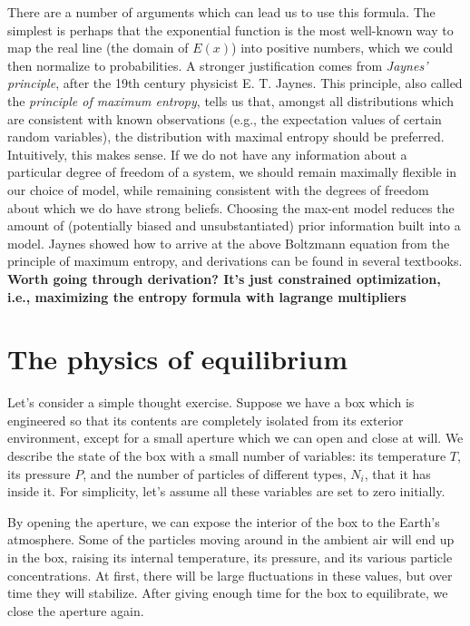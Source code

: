 \documentclass[a4paper]{article}
\begin{document}
There are a number of arguments which can lead us to use this formula. The simplest is perhaps that the exponential function is the most well-known way to map the real line (the domain of $E(x)$) into positive numbers, which we could then normalize to probabilities. A stronger justification comes from \emph{Jaynes' principle}, after the 19th century physicist E. T. Jaynes. This principle, also called the \emph{principle of maximum entropy}, tells us that, amongst all distributions which are consistent with known observations (e.g., the expectation values of certain random variables), the distribution with maximal entropy should be preferred. Intuitively, this makes sense. If we do not have any information about a particular degree of freedom of a system, we should remain maximally flexible in our choice of model, while remaining consistent with the degrees of freedom about which we do have strong beliefs. Choosing the max-ent model reduces the amount of (potentially biased and unsubstantiated) prior information built into a model. Jaynes showed how to arrive at the above Boltzmann equation from the principle of maximum entropy, and derivations can be found in several textbooks. \textbf{Worth going through derivation? It's just constrained optimization, i.e., maximizing the entropy formula with lagrange multipliers}






\section{The physics of equilibrium}



Let's consider a simple thought exercise. Suppose we have a box which is engineered so that its contents are completely isolated from its exterior environment, except for a small aperture which we can open and close at will. We describe the state of the box with a small number of variables: its temperature $T$, its pressure $P$, and the number of particles of different types, $N_i$, that it has inside it. For simplicity, let's assume all these variables are set to zero initially. 

By opening the aperture, we can expose the interior of the box to the Earth's atmosphere. Some of the particles moving around in the ambient air will end up in the box, raising its internal temperature, its pressure, and its various particle concentrations. At first, there will be large fluctuations in these values, but over time they will stabilize. After giving enough time for the box to equilibrate, we close the aperture again. 
\end{document}
